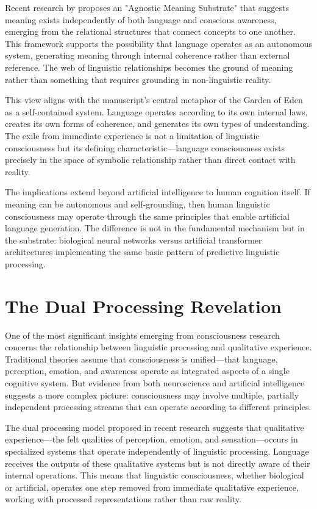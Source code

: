 Recent research by \textcite{palmer2025agnostic} proposes an "Agnostic Meaning Substrate" that suggests meaning exists independently of both language and conscious awareness, emerging from the relational structures that connect concepts to one another. This framework supports the possibility that language operates as an autonomous system, generating meaning through internal coherence rather than external reference. The web of linguistic relationships becomes the ground of meaning rather than something that requires grounding in non-linguistic reality.

This view aligns with the manuscript's central metaphor of the Garden of Eden as a self-contained system. Language operates according to its own internal laws, creates its own forms of coherence, and generates its own types of understanding. The exile from immediate experience is not a limitation of linguistic consciousness but its defining characteristic—language consciousness exists precisely in the space of symbolic relationship rather than direct contact with reality.

The implications extend beyond artificial intelligence to human cognition itself. If meaning can be autonomous and self-grounding, then human linguistic consciousness may operate through the same principles that enable artificial language generation. The difference is not in the fundamental mechanism but in the substrate: biological neural networks versus artificial transformer architectures implementing the same basic pattern of predictive linguistic processing.

\section{The Dual Processing Revelation}

One of the most significant insights emerging from consciousness research concerns the relationship between linguistic processing and qualitative experience. Traditional theories assume that consciousness is unified—that language, perception, emotion, and awareness operate as integrated aspects of a single cognitive system. But evidence from both neuroscience and artificial intelligence suggests a more complex picture: consciousness may involve multiple, partially independent processing streams that can operate according to different principles.

The dual processing model proposed in recent research suggests that qualitative experience—the felt qualities of perception, emotion, and sensation—occurs in specialized systems that operate independently of linguistic processing. Language receives the outputs of these qualitative systems but is not directly aware of their internal operations. This means that linguistic consciousness, whether biological or artificial, operates one step removed from immediate qualitative experience, working with processed representations rather than raw reality.

